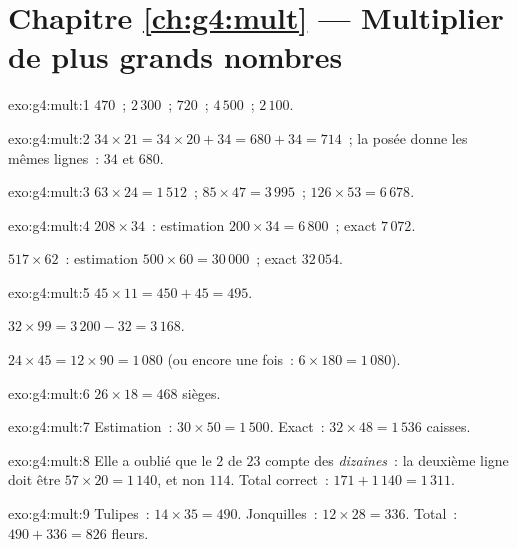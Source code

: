 \section*{Chapitre \ref{ch:g4:mult} --- Multiplier de plus grands nombres}

\begin{solution}{exo:g4:mult:1}
$470$~; \quad $2\,300$~; \quad $720$~; \quad $4\,500$~; \quad
$2\,100$.
\end{solution}

\begin{solution}{exo:g4:mult:2}
$34 \times 21 = 34 \times 20 + 34 = 680 + 34 = 714$~; la posée
donne les mêmes lignes~: $34$ et $680$.
\end{solution}

\begin{solution}{exo:g4:mult:3}
$63 \times 24 = 1\,512$~; \quad
$85 \times 47 = 3\,995$~; \quad
$126 \times 53 = 6\,678$.
\end{solution}

\begin{solution}{exo:g4:mult:4}
$208 \times 34$~: estimation $200 \times 34 = 6\,800$~; exact
$7\,072$.

$517 \times 62$~: estimation $500 \times 60 = 30\,000$~; exact
$32\,054$.
\end{solution}

\begin{solution}{exo:g4:mult:5}
$45 \times 11 = 450 + 45 = 495$.

$32 \times 99 = 3\,200 - 32 = 3\,168$.

$24 \times 45 = 12 \times 90 = 1\,080$ (ou encore une fois~:
$6 \times 180 = 1\,080$).
\end{solution}

\begin{solution}{exo:g4:mult:6}
$26 \times 18 = 468$ sièges.
\end{solution}

\begin{solution}{exo:g4:mult:7}
Estimation~: $30 \times 50 = 1\,500$. Exact~:
$32 \times 48 = 1\,536$ caisses.
\end{solution}

\begin{solution}{exo:g4:mult:8}
Elle a oublié que le $2$ de $23$ compte des \emph{dizaines}~: la
deuxième ligne doit être $57 \times 20 = 1\,140$, et non $114$.
Total correct~: $171 + 1\,140 = 1\,311$.
\end{solution}

\begin{solution}{exo:g4:mult:9}
Tulipes~: $14 \times 35 = 490$. Jonquilles~: $12 \times 28 = 336$.
Total~: $490 + 336 = 826$ fleurs.
\end{solution}

